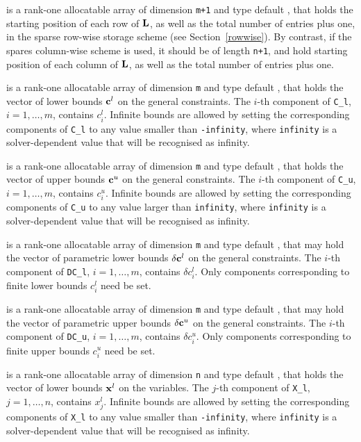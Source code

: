 \documentclass{galahad}
\begin{document}
\begin{description}
\begin{description}
 is a rank-one allocatable array of dimension {\tt m+1} and type 
default \integer, that holds the 
starting position of each row of ${\mathbf{L}}$, as well
as the total number of entries plus one, in the sparse row-wise storage
scheme (see Section~\ref{rowwise}). By contrast, if the spares column-wise 
scheme is used, it should be of length {\tt n+1}, and hold
starting position of each column of ${\mathbf{L}}$, as well
as the total number of entries plus one.
\end{description}

 is a rank-one allocatable array of dimension {\tt m} and type 
default \realdp, that holds the vector of lower bounds ${\mathbf{c}}^{l}$ 
on the general constraints. The $i$-th component of 
{\tt C\_l}, $i = 1, \ldots , m$, contains $c_{i}^{l}$.
Infinite bounds are allowed by setting the corresponding 
components of {\tt C\_l} to any value smaller than {\tt -infinity}, 
where {\tt infinity} is a  solver-dependent value that will be recognised as
infinity.

 is a rank-one allocatable array of dimension {\tt m} and type 
default \realdp, that holds the vector of upper bounds ${\mathbf{c}}^{u}$ 
on the general constraints. The $i$-th component of 
{\tt C\_u}, $i = 1,  \ldots ,  m$, contains $c_{i}^{u}$.
Infinite bounds are allowed by setting the corresponding 
components of {\tt C\_u} to any value larger than {\tt infinity}, 
where {\tt infinity} is a  solver-dependent value that will be recognised as
infinity.

 is a rank-one allocatable array of dimension {\tt m} and type 
default \realdp, that may hold the vector of parametric lower bounds 
$\delta {\mathbf{c}}^{l}$ on the general constraints. The $i$-th component of 
{\tt DC\_l}, $i = 1, \ldots , m$, contains $\delta c_{i}^{l}$.
Only components corresponding to finite lower bounds $c_{i}^{l}$
need be set.

 is a rank-one allocatable array of dimension {\tt m} and type 
default \realdp, that may hold the vector of parametric upper bounds 
$\delta {\mathbf{c}}^{u}$  on the general constraints. The $i$-th component of 
{\tt DC\_u}, $i = 1,  \ldots ,  m$, contains $\delta c_{i}^{u}$.
Only components corresponding to finite upper bounds $c_{i}^{u}$
need be set.

 is a rank-one allocatable array of dimension {\tt n} and type 
default \realdp, that holds
the vector of lower bounds ${\mathbf{x}}^{l}$ on the variables.
The $j$-th component of {\tt X\_l}, $j = 1, \ldots , n$, 
contains $x_{j}^{l}$.
Infinite bounds are allowed by setting the corresponding 
components of {\tt X\_l} to any value smaller than {\tt -infinity}, 
where {\tt infinity} is a  solver-dependent value that will be recognised as
infinity.


\end{description}
\end{document}
